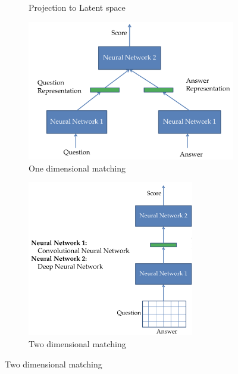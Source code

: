 \begin{itemize}
\begin{figure}[ht]
\begin{subfigure}[b]{0.3\textwidth}
			\caption{Projection to Latent space}
			\label{img:neural_model_architecture_comparisons_projection_latent_space}
		\end{subfigure}
		\hspace{2mm}
		\begin{subfigure}[b]{0.3\textwidth}
			\centering
			\includegraphics[width=\textwidth]{figures/neural_models_one_dimensional_matching.png}
			\caption{One dimensional matching}
			\label{img:neural_model_architecture_comparisons_one_dim_matching}
		\end{subfigure}
		\hspace{2mm}
		\begin{subfigure}[b]{0.3\textwidth}
			\centering
			\includegraphics[width=0.8\textwidth]{figures/neural_models_two_dim_matching.png}
			\caption{Two dimensional matching}

\end{subfigure}
\end{figure}
\end{itemize}
